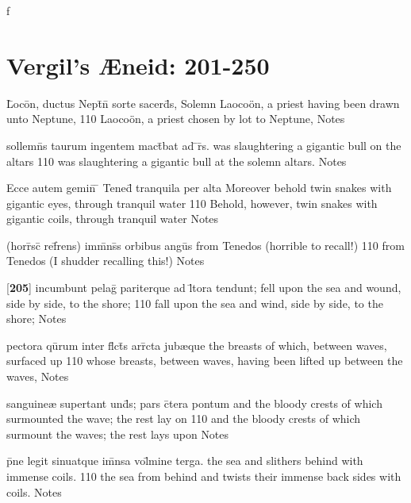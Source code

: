 f\section{Vergil's {\AE}neid: 201-250} %

\latline
  {L\={}oco\={}n, ductus Nept\={}n\={} sorte sacerd\={}s,}
  { Solemn Laoco\"on, a priest having been drawn unto Neptune, }
  {110}
  { Laoco\"on, a priest chosen by lot to Neptune, }
  { Notes }


\latline
  {sollemn\={\macron {\i}}s taurum ingentem mact\={}bat ad \={}r\={}s.}       
	{was slaughtering a gigantic bull on the altars  }
  {110}
  {was slaughtering a gigantic bull at the solemn altars.  }
  { Notes }


\latline
  {Ecce autem gemin\={\macron {\i}} \={} Tened\={} tranquila per alta}
	{ Moreover behold twin snakes with gigantic eyes, through tranquil water  }
  {110}
  { Behold, however, twin snakes with gigantic coils, through tranquil water  }                
  { Notes }


\latline
  {(horr\={}sc\={} ref\={}rens) imm\={}ns\={\macron {\i}}s orbibus angu\={}s}
	{ from Tenedos (horrible to recall!) }
  {110}
  { from Tenedos (I shudder recalling this!) }
  { Notes }


\latline
  {[\textbf{205}] incumbunt pelag\={} pariterque ad l\={\macron {\i}}tora tendunt;}
	{ fell upon the sea and wound, side by side, to the shore;  }
  {110}
  { fall upon the sea and wind, side by side, to the shore;  }   
  { Notes }


\latline
  {pectora qu\={}rum inter fl\={}ct\={}s arr\={}cta jub{\ae}que}
	{ the breasts of which, between waves, surfaced up  }
  {110}
  { whose breasts, between waves, having been lifted up between the waves,  }
  { Notes }


\latline
  {sanguine{\ae} supertant und\={}s; pars c\={}tera pontum}
	{ and the bloody crests of which surmounted the wave; the rest lay on  }
  {110}
  { and the bloody crests of which surmount the waves; the rest lays upon  }
  { Notes }


\latline
  {p\={}ne legit sinuatque im\={}nsa vol\={}mine terga.}
	{ the sea and slithers behind with immense coils. }
  {110}
  { the sea from behind and twists their immense back sides with coils. }   
  { Notes }


